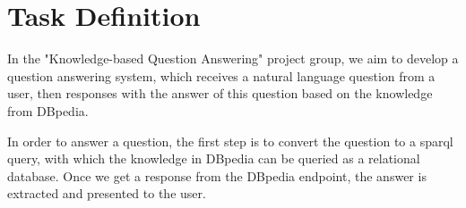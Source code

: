
\section{Task Definition}

In the "Knowledge-based Question Answering" project group, 
we aim to develop a question answering system, 
which receives a natural language question from a user, 
then responses with the answer of this question based on the knowledge from DBpedia. 

In order to answer a question,
the first step is to convert the question to a sparql query,
with which the knowledge in DBpedia can be queried as a relational database. 
Once we get a response from the DBpedia endpoint, 
the answer is extracted and presented to the user. 

